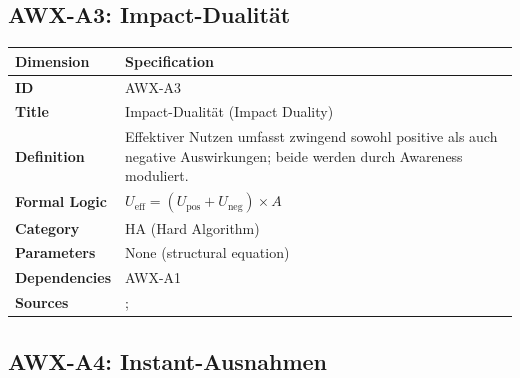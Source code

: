 
\subsection{AWX-A3: Impact-Dualität}

\begin{table}[htbp]
\small
\begin{tabular}{p{3cm}p{11cm}}
\toprule
\textbf{Dimension} & \textbf{Specification} \\
\midrule
\textbf{ID} & AWX-A3 \\
\textbf{Title} & Impact-Dualität (Impact Duality) \\
\textbf{Definition} & Effektiver Nutzen umfasst zwingend sowohl positive als auch negative Auswirkungen; beide werden durch Awareness moduliert. \\
\textbf{Formal Logic} & $U_{\text{eff}} = (U_{\text{pos}} + U_{\text{neg}}) \times A$ \\
\textbf{Category} & HA (Hard Algorithm) \\
\textbf{Parameters} & None (structural equation) \\
\textbf{Dependencies} & AWX-A1 \\
\textbf{Sources} & \citet{kahneman1991loss}; \citet{tversky1992advances} \\
\bottomrule
\end{tabular}
\end{table}


\subsection{AWX-A4: Instant-Ausnahmen}

